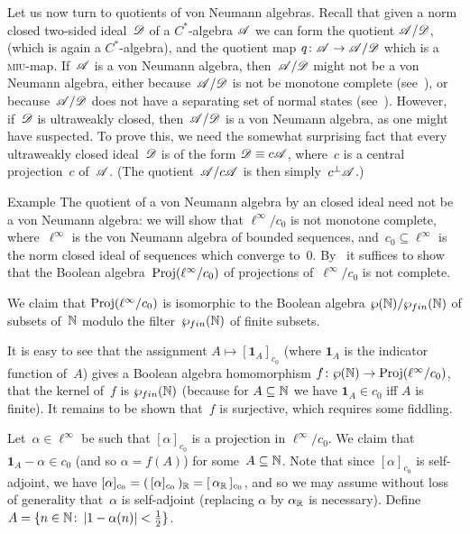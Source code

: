 \documentclass[a]{subfiles}
\begin{document}
\begin{parsec}%
\begin{point}%
Let us now turn to quotients of von Neumann algebras.
Recall that given a norm closed two-sided ideal~$\mathscr{D}$
of a $C^*$-algebra $\mathscr{A}$
we can form the quotient $\mathscr{A}/\mathscr{D}$,
(which is again a $C^*$-algebra),
and the quotient map $q\colon \mathscr{A}\to \mathscr{A}/\mathscr{D}$
which is a \textsc{miu}-map.
If~$\mathscr{A}$ is a von Neumann algebra,
then~$\mathscr{A}/\mathscr{D}$ might not be a von Neumann algebra,
either because~$\mathscr{A}/\mathscr{D}$ is not be monotone complete 
(see~),
or because~$\mathscr{A}/\mathscr{D}$ does not have a separating set of normal states
(see~\TODO{}).
However, if~$\mathscr{D}$ is ultraweakly closed,
then~$\mathscr{A}/\mathscr{D}$ is a von Neumann algebra,
as one might have suspected.
To prove this,
we need the somewhat surprising
fact that every ultraweakly closed
ideal~$\mathscr{D}$ is of the form $\mathscr{D}\equiv c\mathscr{A}$,
where~$c$ is a central projection~$c$ of~$\mathscr{A}$.
(The quotient~$\mathscr{A}/c\mathscr{A}$ is then simply~$c^\perp\mathscr{A}$.)
\end{point}
\begin{point}{Example}%
The quotient of a von Neumann algebra
by an closed ideal
need not be a von Neumann algebra:
we will show that $\ell^\infty/c_0$
is not monotone complete,
where~$\ell^\infty$ is the von Neumann algebra
of bounded sequences,
and~$c_0\subseteq \ell^\infty$
is the norm closed ideal of
sequences which converge to~$0$.
By~
it suffices to show that the Boolean algebra~$\operatorname{Proj}(\ell^\infty/c_0)$
of projections of~$\ell^\infty/c_0$ is not complete.
\begin{point}%
We claim that $\operatorname{Proj}(\ell^\infty/c_0)$
is isomorphic to the Boolean algebra
 $\wp(\mathbb{N})/\wp_{fin}(\mathbb{N})$
of subsets of~$\mathbb{N}$ modulo 
the filter~$\wp_{fin}(\mathbb{N})$ of finite subsets.

It is easy to see that the assignment $A\mapsto [\mathbf{1}_A]_{c_0}$
(where $\mathbf{1}_A$ is the indicator function of~$A$)
gives a Boolean algebra homomorphism 
$f\colon \wp(\mathbb{N})\to \operatorname{Proj}(\ell^\infty/c_0)$,
that the kernel of~$f$
is $\wp_{fin}(\mathbb{N})$
(because for $A\subseteq \mathbb{N}$
we have $\mathbf{1}_A\in c_0$ iff $A$ is finite).
It remains to be shown that~$f$ is surjective,
which requires some fiddling.

Let~$\alpha\in \ell^\infty$
be
such that $[\alpha]_{c_0}$ is a projection in $\ell^\infty/c_0$.
We claim that
$\mathbf{1}_A - \alpha \in c_0$ (and so $\alpha=f(A)$)
for some~$A\subseteq \mathbb{N}$.
Note that since $[\alpha]_{c_0}$ is self-adjoint,
we have $[\alpha]_{c_0}=(\,[\alpha]_{c_0}\,)_{\mathbb{R}} = [\,\alpha_{\mathbb{R}}\,]_{c_0}$,
and so we may assume without loss of generality
that~$\alpha$ is self-adjoint
(replacing $\alpha$ by $\alpha_{\mathbb{R}}$ is necessary).
Define $A=\{n\in\mathbb{N}\colon \left|1-\alpha(n)\right|<\frac{1}{2}\}$.


\end{point}
\end{point}
\end{parsec}
\end{document}
